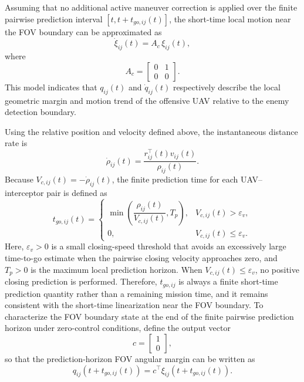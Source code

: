 \documentclass{cja}
\begin{document}
Assuming that no additional active maneuver correction is applied over the finite pairwise prediction interval $[t,t+t_{go,ij}(t)]$, the short-time local motion near the FOV boundary can be approximated as
\begin{equation}
\dot \xi_{ij}(t)
=
A_{c}\,\xi_{ij}(t),
\end{equation}
where
\begin{equation}
A_{c}
=
\begin{bmatrix}
0 & 1\\
0 & 0
\end{bmatrix}.
\end{equation}
This model indicates that $q_{ij}(t)$ and $\dot q_{ij}(t)$ respectively describe the local geometric margin and motion trend of the offensive UAV relative to the enemy detection boundary.

Using the relative position and velocity defined above, the instantaneous distance rate is
\begin{equation}
\dot\rho_{ij}(t)
=
\frac{r_{ij}^{\top}(t)v_{ij}(t)}{\rho_{ij}(t)}.
\end{equation}
Because $V_{c,ij}(t)=-\dot\rho_{ij}(t)$, the finite prediction time for each UAV--interceptor pair is defined as
\begin{equation}
t_{go,ij}(t)
=
\begin{cases}
\displaystyle
\min\!\left(
\dfrac{\rho_{ij}(t)}{V_{c,ij}(t)},
T_p
\right),
& V_{c,ij}(t)>\varepsilon_v,\\[3mm]
0,
& V_{c,ij}(t)\le\varepsilon_v.
\end{cases}
\end{equation}
Here, $\varepsilon_v>0$ is a small closing-speed threshold that avoids an excessively large time-to-go estimate when the pairwise closing velocity approaches zero, and $T_p>0$ is the maximum local prediction horizon. When $V_{c,ij}(t)\le\varepsilon_v$, no positive closing prediction is performed. Therefore, $t_{go,ij}$ is always a finite short-time prediction quantity rather than a remaining mission time, and it remains consistent with the short-time linearization near the FOV boundary.
To characterize the FOV boundary state at the end of the finite pairwise prediction horizon under zero-control conditions, define the output vector
\begin{equation}
c=
\begin{bmatrix}
1\\
0
\end{bmatrix},
\end{equation}
so that the prediction-horizon FOV angular margin can be written as
\begin{equation}
q_{ij}\!\left(t+t_{go,ij}(t)\right)=c^{\top}\xi_{ij}\!\left(t+t_{go,ij}(t)\right).
\end{equation}
\end{document}

